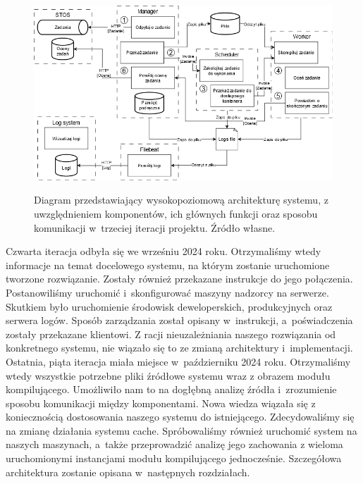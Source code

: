 \begin{figure}[!h]
	\begin{center}
		\resizebox{1.0\textwidth}{!} {
			\includegraphics{img/1/i3_arch.png}
		}
		\caption[Architektura po trzeciej iteracji]{Diagram przedstawiający wysokopoziomową architekturę systemu, z uwzględnieniem komponentów, ich głównych funkcji oraz sposobu komunikacji w~trzeciej iteracji projektu. Źródło własne.}
		\label{i3}
	\end{center}
\end{figure}
\newline \indent Czwarta iteracja odbyła się we wrześniu 2024 roku. Otrzymaliśmy wtedy informacje na temat docelowego systemu, na którym zostanie uruchomione tworzone rozwiązanie. Zostały również przekazane instrukcje do jego połączenia. Postanowiliśmy uruchomić i~skonfigurować maszyny nadzorcy na serwerze. Skutkiem było uruchomienie środowisk deweloperskich, produkcyjnych oraz serwera logów. Sposób zarządzania został opisany w~instrukcji, a~poświadczenia zostały przekazane klientowi. Z racji nieuzależniania naszego rozwiązania od konkretnego systemu, nie wiązało się to ze zmianą architektury i~implementacji. 
\newline \indent Ostatnia, piąta iteracja miała miejsce w~październiku 2024 roku. Otrzymaliśmy wtedy wszystkie potrzebne pliki źródłowe systemu wraz z obrazem modułu kompilującego. Umożliwiło nam to na dogłębną analizę źródła i~zrozumienie sposobu komunikacji między komponentami. Nowa wiedza wiązała się z koniecznością dostosowania naszego systemu do istniejącego. Zdecydowaliśmy się na zmianę działania systemu cache. Spróbowaliśmy również uruchomić system na naszych maszynach, a~także przeprowadzić analizę jego zachowania z wieloma uruchomionymi instancjami modułu kompilującego jednocześnie. Szczegółowa architektura zostanie opisana w~następnych rozdziałach.